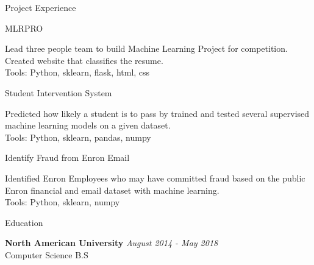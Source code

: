 \documentclass[14pt]{resume} %
\begin{document}
\begin{rSection}{Project Experience}


\begin{rSubsection}{MLRPRO}{}{}{}
\item Lead three people team to build Machine Learning Project for competition. Created website that classifies the resume.
\\ Tools: Python, sklearn, flask, html, css

\end{rSubsection}




\begin{rSubsection}{Student Intervention System}{}{}{}
\item Predicted how likely a student is to pass by trained and tested several supervised machine learning models on a given dataset.
\\ Tools: Python, sklearn, pandas, numpy
\end{rSubsection}



\begin{rSubsection}{Identify Fraud from Enron Email}{}{}{}
\item Identified Enron Employees who may have committed fraud based on the public Enron financial and email dataset with machine learning.
\\ Tools: Python, sklearn, numpy
\end{rSubsection}



\end{rSection}

\begin{rSection}{Education}

{\bf North American University} \hfill {\em August 2014 - May 2018} 
\\ Computer Science B.S \hfill {}
 


\end{rSection}
\end{document}
